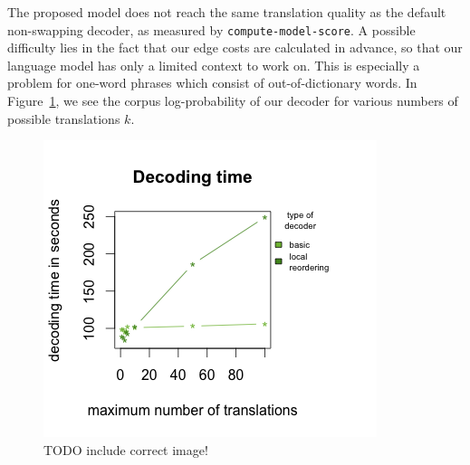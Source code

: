 The proposed model does not reach the same translation quality as the
default non-swapping decoder, as measured by \texttt{compute-model-score}.
A possible difficulty lies in the fact that our edge costs are calculated in
advance, so that our language model has only a limited context to work on.
This is especially a problem for one-word phrases which consist of
out-of-dictionary words. In Figure~\ref{decode3}, we see the corpus
log-probability of our decoder for various numbers of possible translations
$k$.

\begin{figure}
    \centering{}
    \includegraphics[width=\textwidth]{figures/k_time.png}
    \caption{TODO include correct image!}\label{decode3}
\end{figure}
